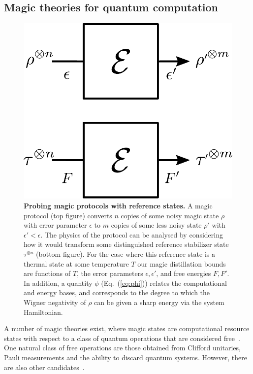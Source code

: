 \documentclass[pra,
aps,
twocolumn,
superscriptaddress,
groupedaddress,
nofootinbib,
reprint
]{revtex4-1}
\begin{document}
\subsection{Magic theories for quantum computation}
\label{sec:mono}
\begin{figure}[t]
    \centering
        \includegraphics[scale=0.3]{figs/protocol_diagram.pdf}
    \caption{\textbf{Probing magic protocols with reference states.} 
	A magic protocol (top figure) converts $n$ copies of some noisy magic state $\rho$ with error parameter $\epsilon$ to $m$ copies of some less noisy state $\rho'$ with $\epsilon' < \epsilon$. The physics of the protocol can be analysed by considering how it would transform some distinguished reference stabilizer state $\tau^{\otimes n}$ (bottom figure). For the case where this reference state is a thermal state at some temperature $T$ our magic distillation bounds are functions of $T$, the error parameters $\epsilon, \epsilon'$, and free energies $F, F'$. In addition, a quantity $\phi$ (Eq.~(\ref{eq:phi})) relates the computational and energy bases, and corresponds to the degree to which the Wigner negativity of $\rho$ can be given a sharp energy via the system Hamiltonian.}
    \label{fig:sketch}
\end{figure}
A number of magic theories exist, where magic states are computational resource states with respect to a class of quantum operations that are considered free~\cite{Gour_2019}. One natural class of free operations are those obtained from Clifford unitaries, Pauli measurements and the ability to discard quantum systems. However, there are also other candidates~\cite{cit:ahmadi, cit:seddon, Wang_2019}.
\end{document}
